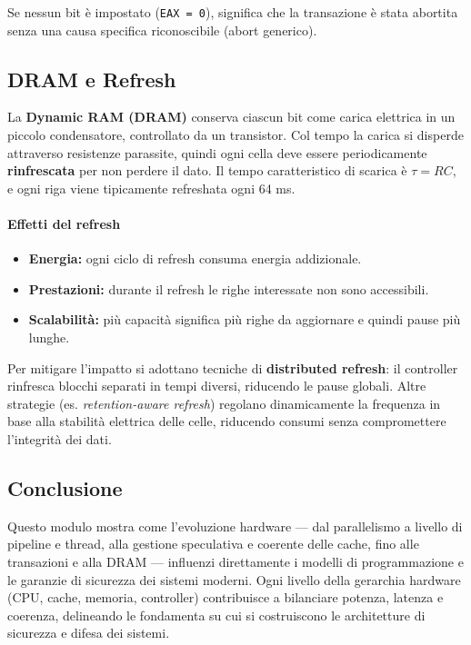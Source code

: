\noindent
Se nessun bit è impostato (\texttt{EAX = 0}), significa che la transazione è stata abortita senza una causa specifica riconoscibile (abort generico).

\subsection{DRAM e Refresh}
La \textbf{Dynamic RAM (DRAM)} conserva ciascun bit come carica elettrica in un piccolo condensatore, controllato da un transistor.  
Col tempo la carica si disperde attraverso resistenze parassite, quindi ogni cella deve essere periodicamente \textbf{rinfrescata} per non perdere il dato.  
Il tempo caratteristico di scarica è $\tau = RC$, e ogni riga viene tipicamente refreshata ogni 64 ms.

\paragraph{Effetti del refresh}
\begin{itemize}
  \item \textbf{Energia:} ogni ciclo di refresh consuma energia addizionale.
  \item \textbf{Prestazioni:} durante il refresh le righe interessate non sono accessibili.
  \item \textbf{Scalabilità:} più capacità significa più righe da aggiornare e quindi pause più lunghe.
\end{itemize}
Per mitigare l’impatto si adottano tecniche di \textbf{distributed refresh}: il controller rinfresca blocchi separati in tempi diversi, riducendo le pause globali.  
Altre strategie (es. \emph{retention-aware refresh}) regolano dinamicamente la frequenza in base alla stabilità elettrica delle celle, riducendo consumi senza compromettere l’integrità dei dati.

\subsection*{Conclusione}
Questo modulo mostra come l’evoluzione hardware — dal parallelismo a livello di pipeline e thread, alla gestione speculativa e coerente delle cache, fino alle transazioni e alla DRAM — influenzi direttamente i modelli di programmazione e le garanzie di sicurezza dei sistemi moderni.  
Ogni livello della gerarchia hardware (CPU, cache, memoria, controller) contribuisce a bilanciare potenza, latenza e coerenza, delineando le fondamenta su cui si costruiscono le architetture di sicurezza e difesa dei sistemi.
